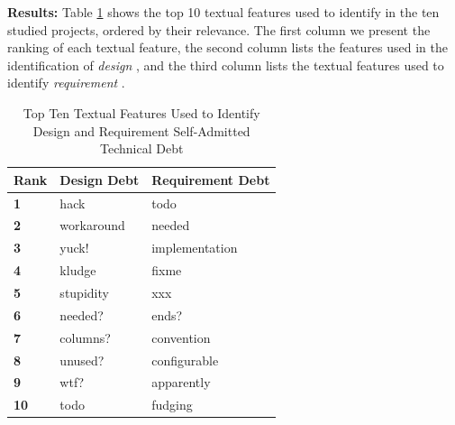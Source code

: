 
\noindent \textbf{Results:} Table \ref{tbl:top_ten_features} shows the top 10 textual features used to identify  \SATD in the ten studied projects, ordered by their relevance. The first column we present the ranking of each textual feature, the second column lists the features used in the identification of \emph{design} \SATD, and the third column lists the textual features used to identify \emph{requirement} \SATD.

\begin{table}[!thb]
    \begin{center}
        \caption{Top Ten Textual Features Used to Identify Design and Requirement Self-Admitted Technical Debt}
        \label{tbl:top_ten_features}
        \begin{tabular}{l| l l }
        \toprule
        \textbf{Rank} & \textbf{Design Debt} & \textbf{Requirement Debt}  \\
        \midrule
         \textbf{1}  & hack       &   todo              \\
         \textbf{2}  & workaround &   needed            \\
         \textbf{3}  & yuck!      &   implementation    \\
         \textbf{4}  & kludge     &   fixme             \\
         \textbf{5}  & stupidity  &   xxx               \\
         \textbf{6}  & needed?    &   ends?             \\
         \textbf{7}  & columns?   &   convention        \\
         \textbf{8}  & unused?    &   configurable      \\
         \textbf{9}  & wtf?       &   apparently        \\
         \textbf{10} & todo       &   fudging           \\
        \bottomrule
        \end{tabular}
    \end{center}    
\end{table}

